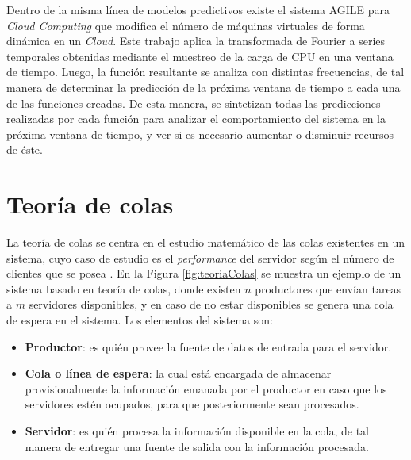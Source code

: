Dentro de la misma línea de modelos predictivos existe el sistema AGILE \citep{NguyenSGSW13} para \textit{Cloud Computing} que modifica el número de máquinas virtuales de forma dinámica en un \textit{Cloud}. Este trabajo aplica la transformada de Fourier \citep{falk2012first} a series temporales obtenidas mediante el muestreo de la carga de CPU en una ventana de tiempo. Luego, la función resultante se analiza con distintas frecuencias, de tal manera de determinar la predicción de la próxima ventana de tiempo a cada una de las funciones creadas. De esta manera, se sintetizan \normalsize{todas las predicciones} realizadas por cada función para analizar el comportamiento del sistema en la próxima ventana de tiempo, y ver si es necesario aumentar o disminuir recursos de éste.

\section{Teoría de colas}
\label{sec:teoriaColas}

La teoría de colas se centra en el estudio matemático de las colas existentes en un sistema, cuyo caso de estudio \normalsize{es el \textit{performance} del servidor según el número de clientes que se posea} \citep{cooper1972introduction}. En la Figura \ref{fig:teoriaColas} se muestra un ejemplo de un sistema basado en teoría de colas, donde existen $n$ productores que envían tareas a $m$ servidores disponibles, y en caso de no estar disponibles se genera una cola de espera en el sistema. Los elementos del sistema son:

\begin{itemize}
	\item \textbf{Productor}: es quién provee la fuente de datos de entrada para el servidor.
	\item \textbf{Cola o línea de espera}: la cual está encargada de almacenar provisionalmente la información emanada por el productor en caso que los servidores estén ocupados, para que posteriormente sean procesados.
	\item \textbf{Servidor}: es quién procesa la información disponible en la cola, de tal manera de entregar una fuente de salida con la información procesada.
\end{itemize}

